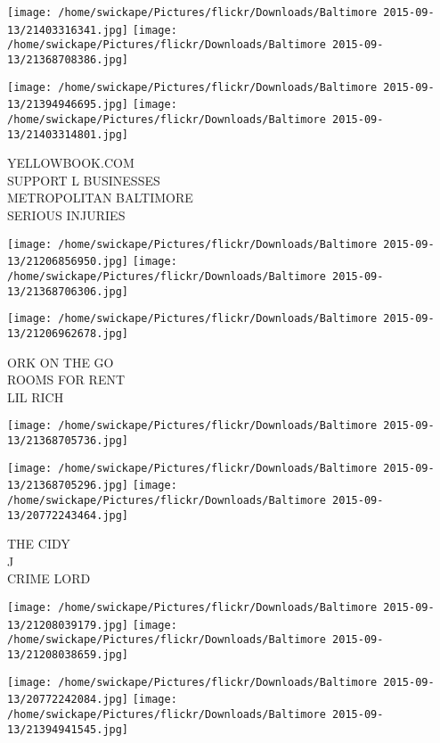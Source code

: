 \documentclass[10pt,letterpaper]{article}
\begin{document}
\texttt{[image: /home/swickape/Pictures/flickr/Downloads/Baltimore 2015-09-13/21403316341.jpg]}
\texttt{[image: /home/swickape/Pictures/flickr/Downloads/Baltimore 2015-09-13/21368708386.jpg]}

\texttt{[image: /home/swickape/Pictures/flickr/Downloads/Baltimore 2015-09-13/21394946695.jpg]}
\texttt{[image: /home/swickape/Pictures/flickr/Downloads/Baltimore 2015-09-13/21403314801.jpg]}

YELLOWBOOK.COM\\
SUPPORT L BUSINESSES\\
METROPOLITAN BALTIMORE\\
SERIOUS INJURIES\\
\pagebreak

\texttt{[image: /home/swickape/Pictures/flickr/Downloads/Baltimore 2015-09-13/21206856950.jpg]}
\texttt{[image: /home/swickape/Pictures/flickr/Downloads/Baltimore 2015-09-13/21368706306.jpg]}

\vspace{0.25in}
\texttt{[image: /home/swickape/Pictures/flickr/Downloads/Baltimore 2015-09-13/21206962678.jpg]}

ORK ON THE GO\\
ROOMS FOR RENT\\
LIL RICH\\
\pagebreak

\texttt{[image: /home/swickape/Pictures/flickr/Downloads/Baltimore 2015-09-13/21368705736.jpg]}

\vspace{0.25in}
\texttt{[image: /home/swickape/Pictures/flickr/Downloads/Baltimore 2015-09-13/21368705296.jpg]}
\texttt{[image: /home/swickape/Pictures/flickr/Downloads/Baltimore 2015-09-13/20772243464.jpg]}

THE CIDY\\
J\\
CRIME LORD\\
\pagebreak

\texttt{[image: /home/swickape/Pictures/flickr/Downloads/Baltimore 2015-09-13/21208039179.jpg]}
\texttt{[image: /home/swickape/Pictures/flickr/Downloads/Baltimore 2015-09-13/21208038659.jpg]}

\texttt{[image: /home/swickape/Pictures/flickr/Downloads/Baltimore 2015-09-13/20772242084.jpg]}
\texttt{[image: /home/swickape/Pictures/flickr/Downloads/Baltimore 2015-09-13/21394941545.jpg]}
\end{document}
